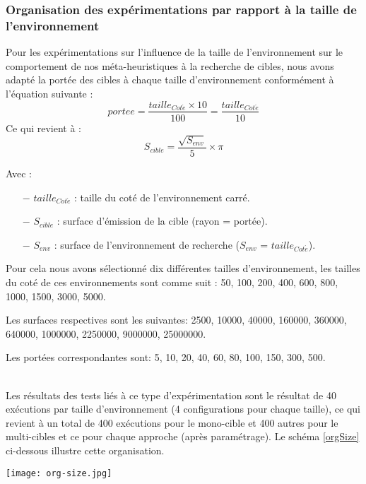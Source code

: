 	\subsubsection{Organisation des expérimentations par rapport à la taille de l'environnement}
	Pour les expérimentations sur l'influence de la taille de l'environnement sur le comportement de nos méta-heuristiques à la recherche de cibles, nous avons adapté la portée des cibles à chaque taille d'environnement conformément à l'équation suivante :
	\begin{equation}
	portee = \frac{taille_{Cot\acute{e}} \times 10}{100} = \frac{taille_{Cot\acute{e}}}{10}
	\label{porteeEnv}
	\end{equation}	
	Ce qui revient à :
	\begin{equation}	
	S_{cible} = \frac{\sqrt{S_{env}}}{5} \times \pi
	\end{equation}
	
	Avec :
	\begin{itemize}
		\item[$-$] $taille_{Cot\acute{e}}$ : taille du coté de l'environnement carré.
		\item[$-$] $S_{cible}$ : surface d'émission de la cible (rayon = portée).
		\item[$-$] $S_{env}$ : surface de l'environnement de recherche ($S_{env}$ = $taille_{Cot\acute{e}}$).\\
	\end{itemize}
	
	Pour cela nous avons sélectionné dix différentes tailles d'environnement, les tailles du coté de ces environnements sont comme suit : 50, 100, 200, 400, 600, 800, 1000, 1500, 3000, 5000.
	
	Les surfaces respectives sont les suivantes: 2500, 10000, 40000, 160000, 360000, 640000, 1000000, 2250000, 9000000, 25000000.
	
	Les portées correspondantes sont: 5, 10, 20, 40, 60, 80, 100, 150, 300, 500.
	
	
	\textbf{ }\\
	Les résultats des tests liés à ce type d'expérimentation sont le résultat de 40 exécutions par taille d'environnement (4 configurations pour chaque taille), ce qui revient à un total de 400 exécutions pour le mono-cible et 400 autres pour le multi-cibles et ce pour chaque approche (après paramétrage). Le schéma \ref{orgSize} ci-dessous illustre cette organisation.
	
	\begin{center}	  
		\texttt{[image: org-size.jpg]}%
		\vspace{-0.1 cm}
		\label{orgSize}%
	\end{center}
	
